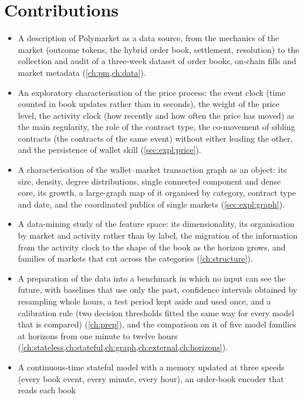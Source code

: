 \section{Contributions}
\label{sec:intro:contributions}

\begin{itemize}[nosep]
  \item A description of Polymarket as a data source, from the mechanics of the market
  (outcome tokens, the hybrid order book, settlement, resolution) to the collection and
  audit of a three-week dataset of order books, on-chain fills and market metadata
  (\cref{ch:pm,ch:data}).
  \item An exploratory characterisation of the price process: the event clock (time
  counted in book updates rather than in seconds), the weight of the price level, the
  activity clock (how recently and how often the price has moved) as the main regularity,
  the role of the contract type, the co-movement of sibling contracts (the contracts of
  the same event) without either leading the other, and the persistence of wallet skill
  (\cref{sec:expl:price}).
  \item A characterisation of the wallet--market transaction graph as an object: its
  size, density, degree distributions, single connected component and dense core, its
  growth, a large-graph map of it organised by category, contract type and date, and the
  coordinated publics of single markets (\cref{sec:expl:graph}).
  \item A data-mining study of the feature space: its dimensionality, its organisation by
  market and activity rather than by label, the migration of the information from the
  activity clock to the shape of the book as the horizon grows, and families of markets
  that cut across the categories (\cref{ch:structure}).
  \item A preparation of the data into a benchmark in which no input can see the future,
  with baselines that use only the past, confidence intervals obtained by resampling whole
  hours, a test period kept aside and used once, and a calibration rule (two decision
  thresholds fitted the same way for every model that is compared) (\cref{ch:prep}), and
  the comparison on it of five model families at horizons from one minute to twelve hours
  (\cref{ch:stateless,ch:stateful,ch:graph,ch:external,ch:horizons}).
  \item A continuous-time stateful model with a memory updated at three speeds (every
  book event, every minute, every hour), an order-book encoder that reads each book

\end{itemize}
